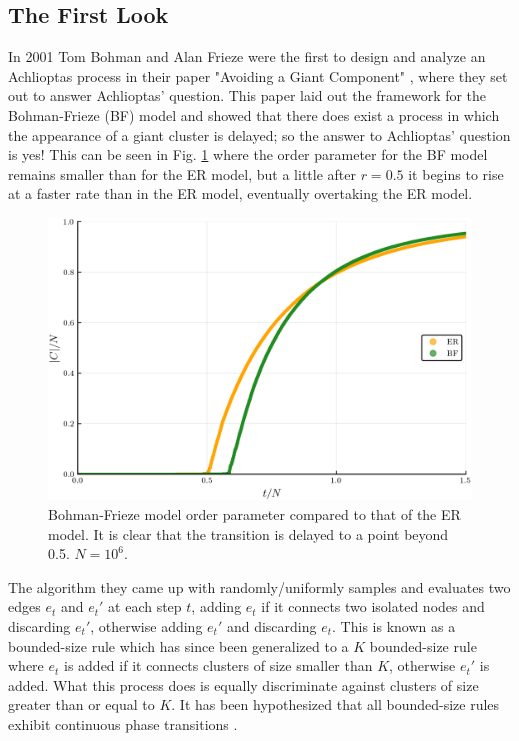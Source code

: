\subsection{The First Look}
In 2001 Tom Bohman and Alan Frieze were the first to design and analyze an Achlioptas process in their paper "Avoiding a Giant Component" \cite{BF}, where they set out to answer Achlioptas' question.
This paper laid out the framework for the Bohman-Frieze (BF) model and showed that there does exist a process in which the appearance of a giant cluster is delayed; so the answer to Achlioptas' question is yes!
This can be seen in Fig. \ref{fig:ER_BF_transition} where the order parameter for the BF model remains smaller than for the ER model, but a little after $r = 0.5$ it begins to rise at a faster rate than in the ER model, eventually overtaking the ER model.

\begin{figure}[H]
	\centering
	\includegraphics[width=350pt]{images/Network_ER_BF_1e6_order_param.png}
	\caption{Bohman-Frieze model order parameter compared to that of the ER model. It is clear that the transition is delayed to a point beyond 0.5. $N = 10^6$.}
	\label{fig:ER_BF_transition}
\end{figure}

The algorithm they came up with randomly/uniformly samples and evaluates two edges $e_t$ and $e_t'$ at each step $t$, adding $e_t$ if it connects two isolated nodes and discarding $e_t'$, otherwise adding $e_t'$ and discarding $e_t$.
This is known as a bounded-size rule which has since been generalized to a $K$ bounded-size rule where $e_t$ is added if it connects clusters of size smaller than $K$, otherwise $e_t'$ is added.
What this process does is equally discriminate against clusters of size greater than or equal to $K$.
It has been hypothesized that all bounded-size rules exhibit continuous phase transitions \cite{Spencer_Wormald}.

